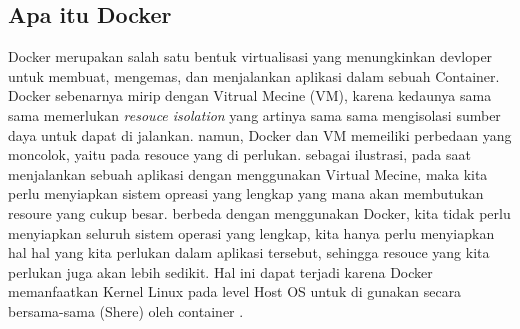 \documentclass[11pt,a4paper]{article}
\begin{document}
\subsection{Apa itu Docker}
Docker merupakan salah satu bentuk virtualisasi yang menungkinkan devloper untuk membuat, 
mengemas, dan menjalankan aplikasi dalam sebuah Container. Docker sebenarnya mirip dengan 
Vitrual Mecine (VM), karena kedaunya sama sama memerlukan \textit{resouce isolation} yang artinya
sama sama mengisolasi sumber daya untuk dapat di jalankan. namun, Docker dan VM memeiliki
perbedaan yang moncolok, yaitu pada resouce yang di perlukan. sebagai ilustrasi, pada saat 
menjalankan sebuah aplikasi dengan menggunakan Virtual Mecine, maka kita perlu menyiapkan 
sistem opreasi yang lengkap yang mana akan membutukan resoure yang cukup besar. berbeda dengan
menggunakan Docker, kita tidak perlu menyiapkan seluruh sistem operasi yang lengkap, kita hanya
perlu menyiapkan hal hal yang kita perlukan dalam aplikasi tersebut, sehingga resouce yang kita 
perlukan juga akan lebih sedikit. Hal ini dapat terjadi karena Docker memanfaatkan Kernel Linux
pada level Host OS untuk di gunakan secara bersama-sama (Shere) oleh container \cite{hanif_2017}.
\end{document}
